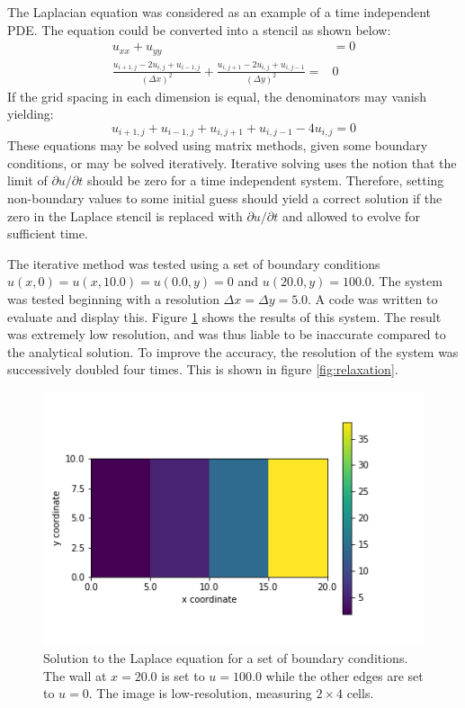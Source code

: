 \documentclass[twocolumn]{article}
\begin{document}
The Laplacian equation was considered as an example of a time independent PDE. The equation could be converted into a stencil as shown below:
\begin{equation}
\begin{split}
u_{xx} + u_{yy} &= 0 \\
\frac{u_{i+1,j} - 2u_{i,j} + u_{i-1,j}}{(\Delta x)^2} + \frac{u_{i,j+1} - 2u_{i,j} + u_{i,j-1}}{(\Delta{y})^2} =&0 
\end{split}
\end{equation}
If the grid spacing in each dimension is equal, the denominators may vanish yielding:
\begin{equation}
u_{i+1,j} + u_{i-1,j} + u_{i,j+1} + u_{i,j-1} - 4u_{i,j}=0
\end{equation}
These equations may be solved using matrix methods, given some boundary conditions, or may be solved iteratively. Iterative solving uses the notion that the limit of $\partial u/ \partial t$ should be zero for a time independent system. Therefore, setting non-boundary values to some initial guess should yield a correct solution if the zero in the Laplace stencil is replaced with  $\partial u/ \partial t$ and allowed to evolve for sufficient time. 

The iterative method was tested using a set of boundary conditions $u(x,0) = u(x,10.0) = u(0.0,y)=0$ and $u(20.0,y)=100.0$. The system was tested beginning with a resolution $\Delta x = \Delta y = 5.0$. A code was written to evaluate and display this. Figure \ref{fig:low_res_iterative} shows the results of this system. The result was extremely low resolution, and was thus liable to be inaccurate compared to the analytical solution. To improve the accuracy, the resolution of the system was successively doubled four times. This is shown in figure \ref{fig:relaxation}. 

\begin{figure}
\centering
\includegraphics[width=\linewidth]{low_res_iterative}
\caption{Solution to the Laplace equation for a set of boundary conditions. The wall at $x=20.0$ is set to $u=100.0$ while the other edges are set to $u=0$. The image is low-resolution, measuring $2\times4$ cells.}
\label{fig:low_res_iterative}
\end{figure}
\end{document}
